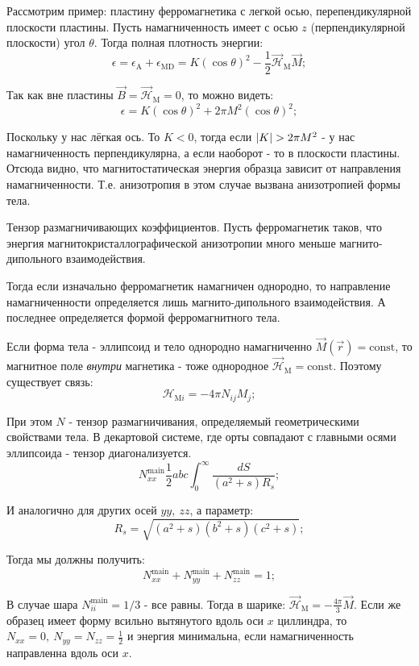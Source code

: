 \documentclass[a4paper, 14pt, russian]{article}
\newcommand{\be}{\begin{equation}}
\newcommand{\ee}{\end{equation}}
\begin{document}
	Рассмотрим пример: пластину ферромагнетика с легкой осью, перепендикулярной плоскости
	пластины. Пусть намагниченность имеет с осью $z$ (перпендикулярной плоскости) 
	угол $\theta$. Тогда полная плотность энергии:
	\be
		\epsilon = \epsilon_\text{A} + \epsilon_\text{MD} = 
			K (\cos \theta)^2 - \frac{1}{2} \vec{\mathcal H}_\text{M} \vec M;
	\ee

	Так как вне пластины $\vec B = \vec{\mathcal H}_\text{M} = 0$, 
	то можно видеть:
	\be
		\epsilon = K (\cos \theta)^2 + 2 \pi M^2 (\cos \theta)^2;
	\ee

	Поскольку у нас лёгкая ось. То $K < 0$, тогда если $\abs{K} > 2 \pi M^2$
	-  у нас намагниченность перпендикулярна, а если наоборот - то в плоскости
	пластины. Отсюда видно, что магнитостатическая энергия образца зависит от 
	направления намагниченности. Т.е. анизотропия в этом случае вызвана
	анизотропией формы тела. 

	Тензор размагничивающих коэффициентов. Пусть ферромагнетик таков, что энергия 
	магнитокристаллографической анизотропии много меньше магнито-дипольного взаимодействия.

	Тогда если изначально ферромагнетик намагничен однородно, то направление намагниченности
	определяется лишь магнито-дипольного взаимодействия. А последнее определяется
	формой ферромагнитного тела.

	Если форма тела - эллипсоид и тело однородно намагниченно $\vec M(\vec r) = \text{const}$,
	то магнитное поле \textit{внутри} магнетика - тоже однородное 
	$\vec{\mathcal H}_\text{M} = \text{const}$. Поэтому существует связь:
	\be
		\label{eq143}
		\mathcal{H}_{\text{M} i} = - 4 \pi N_{ij} M_j;
	\ee

	При этом $N$ - тензор размагничивания, определяемый геометрическими свойствами тела.
	В декартовой системе, где орты совпадают с главными осями эллипсоида - 
	тензор диагонализуется. 
	\be
		\label{eq144}
		N_{xx}^\text{main} \frac{1}{2} abc \int_0^\infty \frac{dS}{(a^2 + s)R_s};
	\ee


	И аналогично для других осей $yy,~zz$, а параметр:
	\be
		R_s = \sqrt{(a^2 + s)(b^2 + s)(c^2 + s)};
	\ee

	Тогда мы должны получить:
	\be
		\label{eq145}
		N_{xx}^\text{main} + N_{yy}^\text{main} + N_{zz}^\text{main} = 1;
	\ee

	В случае шара $N_{ii}^\text{main} = 1/3$ - все равны. Тогда в шарике:
	$\vec{\mathcal H}_\text{M} = - \frac{4\pi}{3} \vec M$. Если же 
	образец имеет форму всильно вытянутого вдоль оси $x$ циллиндра, то
	$N_{xx} = 0,~ N_{yy} = N_{zz} = \frac{1}{2}$ и энергия минимальна, если 
	намагниченность направленна вдоль оси $x$.
\end{document}
